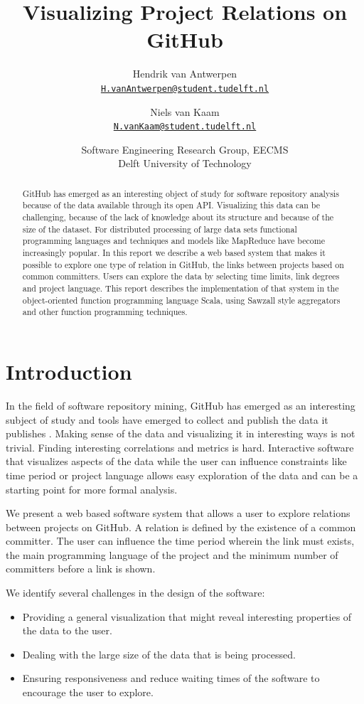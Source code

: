 \documentclass[10pt,a4paper]{article}
\title{Visualizing Project Relations on GitHub}
\author{
    Hendrik van Antwerpen\\{\small\href{mailto:H.vanAntwerpen@student.tudelft.nl}{\nolinkurl{H.vanAntwerpen@student.tudelft.nl}}}
  \and
    Niels van Kaam\\{\small\href{mailto:N.vanKaam@student.tudelft.nl}{\nolinkurl{N.vanKaam@student.tudelft.nl}}}
}
\date{Software Engineering Research Group, EECMS\\Delft University of Technology}
\begin{document}
\maketitle

\begin{abstract}
GitHub has emerged as an interesting object of study for software repository analysis because of the data available through its open API. Visualizing this data can be challenging, because of the lack of knowledge about its structure and because of the size of the dataset. For distributed processing of large data sets functional programming languages and techniques and models like MapReduce have become increasingly popular. In this report we describe a web based system that makes it possible to explore one type of relation in GitHub, the links between projects based on common committers. Users can explore the data by selecting time limits, link degrees and project language. This report describes the implementation of that system in the object-oriented function programming language Scala, using Sawzall style aggregators and other function programming techniques.
\end{abstract}

\section{Introduction}

In the field of software repository mining, GitHub has emerged as an interesting subject of study and tools have emerged to collect and publish the data it publishes \citep{gousios2012ghtorrent}. Making sense of the data and visualizing it in interesting ways is not trivial. Finding interesting correlations and metrics is hard. Interactive software that visualizes aspects of the data while the user can influence constraints like time period or project language allows easy exploration of the data and can be a starting point for more formal analysis.

We present a web based software system that allows a user to explore relations between projects on GitHub. A relation is defined by the existence of a common committer. The user can influence the time period wherein the link must exists, the main programming language of the project and the minimum number of committers before a link is shown.

We identify several challenges in the design of the software:
\begin{itemize}
    \item Providing a general visualization that might reveal interesting properties of the data to the user.
    \item Dealing with the large size of the data that is being processed.
    \item Ensuring responsiveness and reduce waiting times of the software to encourage the user to explore.
\end{itemize}
\end{document}

